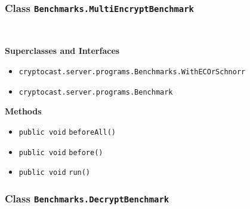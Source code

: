 \subsubsection{Class \lstinline|Benchmarks.MultiEncryptBenchmark|}
 \\
\noindent\begin{minipage}[t]{5cm}
\vspace{0.3em}
\hspace*{2em}
\vspace{0.3em}
\end{minipage}



\textbf{\sffamily Superclasses and Interfaces}
\begin{itemize}
\item \lstinline|cryptocast.server.programs.Benchmarks.WithECOrSchnorr|
\item \lstinline|cryptocast.server.programs.Benchmark|
\end{itemize}



\textbf{\sffamily Methods}
\begin{itemize}
\item \lstinline|public void| \lstinline|beforeAll|\lstinline|()| \\[-0.6em]




\item \lstinline|public void| \lstinline|before|\lstinline|()| \\[-0.6em]




\item \lstinline|public void| \lstinline|run|\lstinline|()| \\[-0.6em]




\end{itemize}

\subsubsection{Class \lstinline|Benchmarks.DecryptBenchmark|}
 \\
\noindent\begin{minipage}[t]{5cm}
\vspace{0.3em}
\hspace*{2em}
\vspace{0.3em}
\end{minipage}



